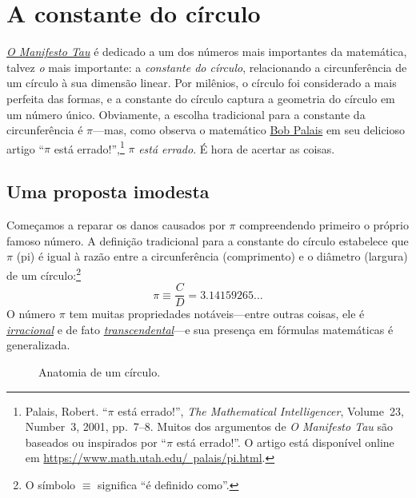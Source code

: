 \section{A constante do círculo} %
\label{sec:the_circle_constant}

\href{https://tauday.com/tau-manifesto}{\emph{O Manifesto Tau}} é dedicado a um dos números mais importantes da matemática, talvez \emph{o} mais importante: a \emph{constante do círculo}, relacionando a circunferência de um círculo à sua dimensão linear. Por milênios, o círculo foi considerado a mais perfeita das formas, e a constante do círculo captura a geometria do círculo em um número único. Obviamente, a escolha tradicional para a constante da circunferência é $\pi$---mas, como observa o matemático \href{https://www.math.utah.edu/~palais/}{Bob Palais} em seu delicioso artigo ``$\pi$ está errado!'',\footnote{Palais, Robert. ``$\pi$ está errado!'', \emph{The Mathematical Intelligencer}, Volume~23, Number~3, 2001, pp.~7--8. Muitos dos argumentos de \emph{O Manifesto Tau} são baseados ou inspirados por ``$\pi$ está errado!''. O artigo está disponível online em \href{https://www.math.utah.edu/~palais/pi.html}{https://www.math.utah.edu/~palais/pi.html}.} $\pi$ \emph{está errado}. É hora de acertar as coisas.

  \subsection{Uma proposta imodesta} %
  \label{sec:an_immodest_proposal}

Começamos a reparar os danos causados ​​por $\pi$ compreendendo primeiro o próprio famoso número. A definição tradicional para a constante do círculo estabelece que $\pi$ (pi) é igual à razão entre a circunferência (comprimento) e o diâmetro (largura) de um círculo:\footnote{O símbolo $\equiv$ significa ``é definido como''.}
\begin{equation}
\label{eq:pi}
\pi \equiv \frac{C}{D} = 3.14159265\ldots
\end{equation}
O número $\pi$ tem muitas propriedades notáveis---entre outras coisas, ele é \href{https://pt.wikipedia.org/wiki/N%C3%BAmero_irracional}{\emph{irracional}} e de fato \href{https://pt.wikipedia.org/wiki/N%C3%BAmero_transcendente}{\emph{transcendental}}---e sua presença em fórmulas matemáticas é generalizada.

\begin{figure}
\caption{Anatomia de um círculo.\label{fig:circle}}
\end{figure}

